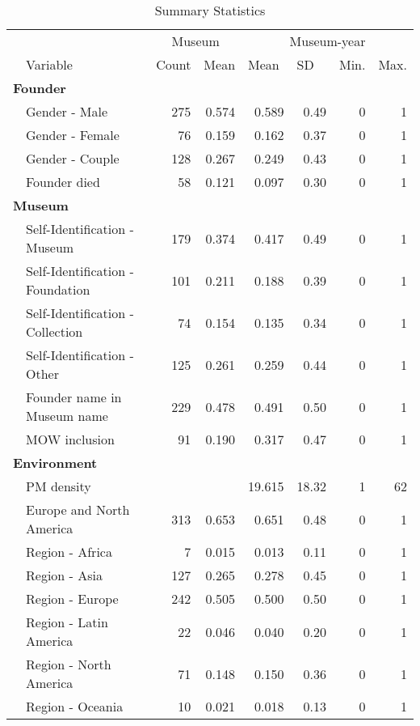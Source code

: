 \documentclass[11pt]{article}
\begin{document}
\begin{table}[ht]
\centering
\begin{tabular}{llrrrrrr}
  \hline
 & & \multicolumn{2}{c}{Museum} & \multicolumn{4}{c}{Museum-year} \\ 
\cmidrule(r){3-4}\cmidrule(r){5-8} \multicolumn{1}{l}{} & \multicolumn{1}{l}{Variable} & \multicolumn{1}{l}{Count} & \multicolumn{1}{l}{Mean} & \multicolumn{1}{l}{Mean} & \multicolumn{1}{l}{SD} & \multicolumn{1}{l}{Min.} & \multicolumn{1}{l}{Max.}\\ 
 \hline
  \multicolumn{8}{l}{\textbf{Founder}} \\ 
 & Gender - Male & 275 & 0.574 &  0.589 &  0.49 & 0 &  1 \\ 
   & Gender - Female & 76 & 0.159 &  0.162 &  0.37 & 0 &  1 \\ 
   & Gender - Couple & 128 & 0.267 &  0.249 &  0.43 & 0 &  1 \\ 
   & Founder died & 58 & 0.121 &  0.097 &  0.30 & 0 &  1 \\ 
   \multicolumn{8}{l}{\textbf{Museum}} \\ 
 & Self-Identification - Museum & 179 & 0.374 &  0.417 &  0.49 & 0 &  1 \\ 
   & Self-Identification - Foundation & 101 & 0.211 &  0.188 &  0.39 & 0 &  1 \\ 
   & Self-Identification - Collection & 74 & 0.154 &  0.135 &  0.34 & 0 &  1 \\ 
   & Self-Identification - Other & 125 & 0.261 &  0.259 &  0.44 & 0 &  1 \\ 
   & Founder name in Museum name & 229 & 0.478 &  0.491 &  0.50 & 0 &  1 \\ 
   & MOW inclusion & 91 & 0.190 &  0.317 &  0.47 & 0 &  1 \\ 
   \multicolumn{8}{l}{\textbf{Environment}} \\ 
 & PM density &  &  & 19.615 & 18.32 & 1 & 62 \\ 
   & Europe and North America & 313 & 0.653 &  0.651 &  0.48 & 0 &  1 \\ 
   & Region - Africa & 7 & 0.015 &  0.013 &  0.11 & 0 &  1 \\ 
   & Region - Asia & 127 & 0.265 &  0.278 &  0.45 & 0 &  1 \\ 
   & Region - Europe & 242 & 0.505 &  0.500 &  0.50 & 0 &  1 \\ 
   & Region - Latin America & 22 & 0.046 &  0.040 &  0.20 & 0 &  1 \\ 
   & Region - North America & 71 & 0.148 &  0.150 &  0.36 & 0 &  1 \\ 
   & Region - Oceania & 10 & 0.021 &  0.018 &  0.13 & 0 &  1 \\ 
   \hline
\end{tabular}
\caption{Summary Statistics} 
\label{tbl:t_sumstats}
\end{table}
\end{document}
